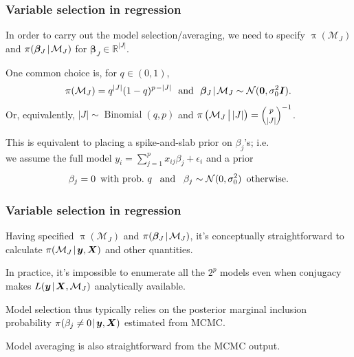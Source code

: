 \documentclass[18pt]{beamer}
\newcommand{\defineTightSpacing}{%
	\setlength{\abovedisplayskip}{.25\baselineskip}%
	\setlength{\belowdisplayskip}{.25\baselineskip}%
}
\renewcommand{\textsc}[1]{{\small \MakeUppercase{#1}}}
\newcommand{\given}{\mskip.7\thinmuskip | \mskip.7\thinmuskip}
\newcommand{\thinnerspace}{\mskip.5\thinmuskip}
\newcommand{\indicator}{\operatorname{\mathds{1}}}
\newcommand{\normalDist}{\operatorname{\mathcal{N}}}
\newcommand{\nPred}{p}
\newcommand{\density}{\operatorname{\pi}}
\newcommand{\likelihood}{L}
\newcommand{\by}{\bm{y}}
\newcommand{\bX}{\bm{X}}
\newcommand{\bbeta}{\bm{\beta}}
\newcommand{\model}{\mathcal{M}}
\newcommand{\nonzeroCoefSet}{J}
\newcommand{\inclusionProb}{q}
\begin{document}
\begin{frame}
\frametitle{Variable selection in regression}
In order to carry out the model selection/averaging, we need to specify $\density(\model_\nonzeroCoefSet)$ and $\density(\bbeta_\nonzeroCoefSet \given \model_\nonzeroCoefSet)$ for $\bbeta_\nonzeroCoefSet \in \mathbb{R}^{|\nonzeroCoefSet|}$. 

\pause
\smallskip
One common choice is, for $\inclusionProb \in (0, 1)$,
\begin{equation*} \defineTightSpacing%
\density(\model_\nonzeroCoefSet) = \inclusionProb^{|\nonzeroCoefSet|} (1 - \inclusionProb)^{\nPred \thinnerspace - |\nonzeroCoefSet|}
	\ \text{ and } \ 
	\bbeta_\nonzeroCoefSet \given \model_\nonzeroCoefSet \sim \normalDist(\bm{0}, \sigma_0^2 \bm{I}).
\end{equation*}
\pause
Or, equivalently, $| \nonzeroCoefSet | \sim \operatorname{Binomial}(\inclusionProb, p)$ and $\density\left( \model_\nonzeroCoefSet \, \big| \, | \nonzeroCoefSet | \right) = \text{\scalebox{0.8}{$\dbinom{p}{| \nonzeroCoefSet|}$}}^{-1}$.

\pause
\smallskip
This is equivalent to placing a spike-and-slab prior on $\beta_j$'s; i.e.\ \\ 
we assume the full model $y_i = \sum_{j = 1}^\nPred x_{ij} \beta_j + \epsilon_i$ and a prior
\begin{equation*} \defineTightSpacing%
\beta_j = 0 \, \text{ with prob.\ } \inclusionProb
	\ \, \text{ and } \ \,
	\beta_j \sim \normalDist(0, \sigma_0^2)
	\, \text{ otherwise.}
\end{equation*}


\end{frame}


\begin{frame}
\frametitle{Variable selection in regression}
Having specified $\density(\model_\nonzeroCoefSet)$ and $\density(\bbeta_\nonzeroCoefSet \given \model_\nonzeroCoefSet)$, it's conceptually straightforward to calculate $\density(\model_\nonzeroCoefSet \given \by, \bX)$ and other quantities.

\pause
\smallskip
In practice, it's impossible to enumerate all the $2^\nPred$ models even when conjugacy makes $\likelihood(\by \given \bX,  \model_\nonzeroCoefSet)$ analytically available.

\pause
\smallskip
Model selection thus typically relies on the posterior marginal inclusion probability $\density(\beta_j \neq 0 \given \by, \bX)$ estimated from \textsc{mcmc}. 

\pause
\smallskip
Model averaging is also straightforward from the \textsc{mcmc} output. 
\end{frame}
\end{document}
